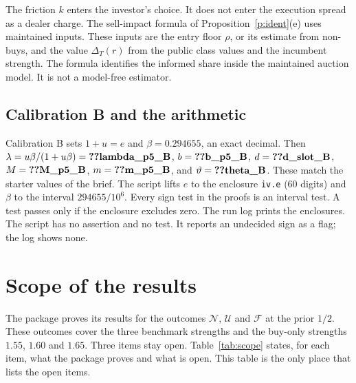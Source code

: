 \documentclass[12pt]{article}
\theoremstyle{definition}
\begin{document}
The friction $k$ enters the investor's choice.
It does not enter the execution spread as a dealer charge.
The sell-impact formula of Proposition~\ref{p:ident}(e) uses maintained inputs.
These inputs are the entry floor $\rho$, or its estimate from non-buys, and the value $\Delta_T(r)$ from the public class values and the incumbent strength.
The formula identifies the informed share inside the maintained auction model.
It is not a model-free estimator.

\subsection{Calibration B and the arithmetic}

Calibration B sets $1+u=e$ and $\beta=0.294655$, an exact decimal.
Then $\lambda=u\beta/(1+u\beta)=\reg{lambda_p5_B}$, $b=\reg{b_p5_B}$, $d=\reg{d_slot_B}$, $M=\reg{M_p5_B}$, $m=\reg{m_p5_B}$, and $\vartheta=\reg{theta_B}$.
These match the starter values of the brief.
The script lifts $e$ to the enclosure \texttt{iv.e} (60 digits) and $\beta$ to the interval $294655/10^6$.
Every sign test in the proofs is an interval test.
A test passes only if the enclosure excludes zero.
The run log prints the enclosures.
The script has no assertion and no test.
It reports an undecided sign as a flag; the log shows none.

\section{Scope of the results}\label{sec:scope}

The package proves its results for the outcomes $\mathcal N$, $\mathcal U$ and $\mathcal F$ at the prior $1/2$.
These outcomes cover the three benchmark strengths and the buy-only strengths $1.55$, $1.60$ and $1.65$.
Three items stay open.
Table~\ref{tab:scope} states, for each item, what the package proves and what is open.
This table is the only place that lists the open items.
\end{document}

